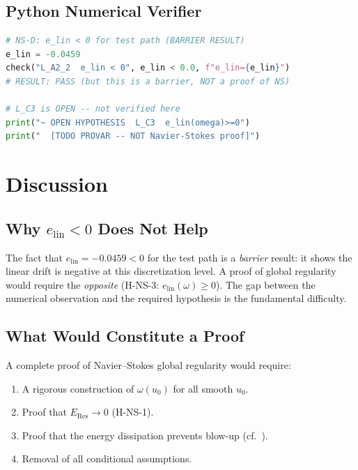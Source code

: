 \documentclass[12pt]{article}
\theoremstyle{plain}
\theoremstyle{definition}
\begin{document}
\subsection{Python Numerical Verifier}

\begin{lstlisting}[language=Python,basicstyle=\small\ttfamily,
    caption={verifica\_lemas.py extract}]
# NS-D: e_lin < 0 for test path (BARRIER RESULT)
e_lin = -0.0459
check("L_A2_2  e_lin < 0", e_lin < 0.0, f"e_lin={e_lin}")
# RESULT: PASS (but this is a barrier, NOT a proof of NS)

# L_C3 is OPEN -- not verified here
print("~ OPEN HYPOTHESIS  L_C3  e_lin(omega)>=0")
print("  [TODO PROVAR -- NOT Navier-Stokes proof]")
\end{lstlisting}

\section{Discussion}

\subsection{Why $e_{\mathrm{lin}} < 0$ Does Not Help}

The fact that $e_{\mathrm{lin}} = -0.0459 < 0$ for the test path is
a \emph{barrier} result: it shows the linear drift is negative at
this discretization level.  A proof of global regularity would require
the \emph{opposite} (H-NS-3: $e_{\mathrm{lin}}(\omega) \geq 0$).
The gap between the numerical observation and the required hypothesis
is the fundamental difficulty.

\subsection{What Would Constitute a Proof}

A complete proof of Navier--Stokes global regularity would require:
\begin{enumerate}
  \item A rigorous construction of $\omega(u_0)$ for all smooth $u_0$.
  \item Proof that $E_{\mathrm{Res}} \to 0$ (H-NS-1).
  \item Proof that the energy dissipation prevents blow-up
    (cf.\ \cite{CKN1982,ESS2003}).
  \item Removal of all conditional assumptions.
\end{enumerate}
\end{document}
